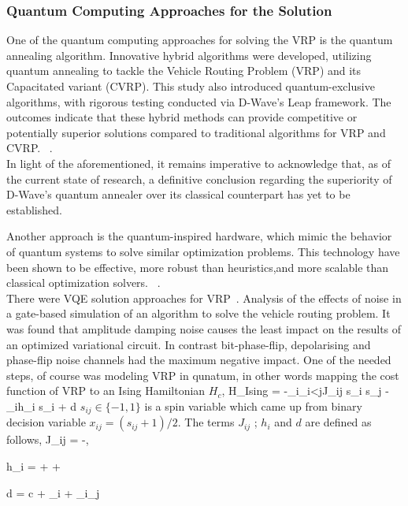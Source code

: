 \subsubsection{Quantum Computing Approaches for the Solution}
One of the quantum computing approaches for solving the VRP is the quantum annealing algorithm.
Innovative hybrid algorithms were developed, utilizing quantum annealing to
tackle the Vehicle Routing Problem (VRP) and its Capacitated variant (CVRP).
This study also introduced quantum-exclusive algorithms, with rigorous testing conducted via D-Wave’s Leap framework.
The outcomes indicate that these hybrid methods can provide competitive or potentially superior solutions
compared to traditional algorithms for VRP and CVRP.
~\cite{borowski2020new}.\\
In light of the aforementioned, it remains imperative to acknowledge that,
as of the current state of research,
a definitive conclusion regarding the superiority of D-Wave's quantum annealer over its classical counterpart has yet to be established.

Another approach is the quantum-inspired hardware, which mimic the behavior of quantum systems to solve
similar optimization problems.
This technology have been shown to be effective, more robust than
heuristics,and more scalable than classical optimization solvers. ~\cite{9605345}.\\

There were VQE solution approaches for VRP~\cite{mohanty2022analysis}.
Analysis of the effects of noise in a gate-based
simulation of an algorithm to solve the vehicle routing problem.
It was found that amplitude damping
noise causes the least impact on the results of an optimized
variational circuit. In contrast bit-phase-flip, depolarising and
phase-flip noise channels had the maximum negative impact.
One of the needed steps, of course was modeling VRP in qunatum, in other words
mapping the cost function of VRP to an Ising Hamiltonian $H_c$,
\equation
{
    H_{Ising} = -\sum_{i}\sum_{i<j}J_{ij} s_i s_j
                -\sum_{i}h_i s_i + d
}
$s_{ij} \in \{-1, 1\}$ is a spin variable which came up from binary decision variable
$x_{ij} = (s_{ij} + 1)/2$.
The terms $J_{ij}$ ; $h_i$ and $d$ are defined as follows,
\equation
{
    J_{ij} = -, 
}


\equation
{
    h_{i} =  + \sum{} + \sum{}
}


\equation
{
    d = c + \sum_{i} + \sum_{i}\sum_{j}
}



